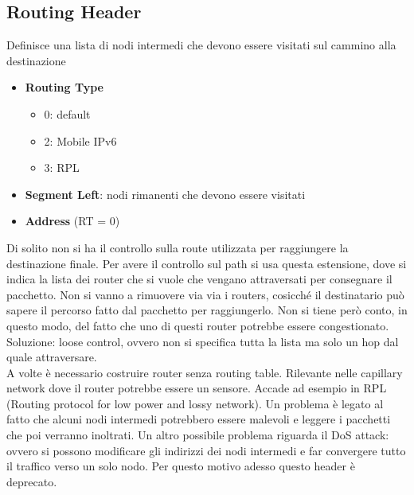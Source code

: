\documentclass{article}
\begin{document}
\subsection{Routing Header}
Definisce una lista di nodi intermedi che devono essere visitati sul cammino alla destinazione
\begin{itemize}
    \item \textbf{Routing Type}
    \begin{itemize}
        \item 0: default
        \item 2: Mobile IPv6
        \item 3: RPL
    \end{itemize}
    \item \textbf{Segment Left}: nodi rimanenti che devono essere visitati
    \item \textbf{Address} (RT = 0)
\end{itemize}
Di solito non si ha il controllo sulla route utilizzata per raggiungere la destinazione finale. Per avere il controllo sul path si usa questa estensione, dove si indica la lista dei router che si vuole che vengano attraversati per consegnare il pacchetto. Non si vanno a rimuovere via via i routers, cosicché il destinatario può sapere il percorso fatto dal pacchetto per raggiungerlo. Non si tiene però conto, in questo modo, del fatto che uno di questi router potrebbe essere congestionato.
Soluzione: loose control, ovvero non si specifica tutta la lista ma solo un hop dal quale attraversare. \\
A volte è necessario costruire router senza routing table. Rilevante nelle capillary network dove il router potrebbe essere un sensore. Accade ad esempio in RPL (Routing protocol for low power and lossy network).
Un problema è legato al fatto che alcuni nodi intermedi potrebbero essere malevoli e leggere i pacchetti che poi verranno inoltrati. Un altro possibile problema riguarda il DoS attack: ovvero si possono modificare gli indirizzi dei nodi intermedi e far convergere tutto il traffico verso un solo nodo. Per questo motivo adesso questo header è deprecato.
\end{document}

